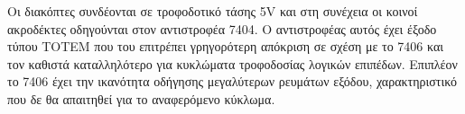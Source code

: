 \documentclass[a4paper,10pt]{article} \usepackage{anysize}
\begin{document}
Οι διακόπτες συνδέονται σε τροφοδοτικό τάσης 5V και στη συνέχεια οι κοινοί
ακροδέκτες οδηγούνται στον αντιστροφέα 7404. Ο αντιστροφέας αυτός έχει έξοδο
τύπου ΤΟΤΕΜ που του επιτρέπει γρηγορότερη απόκριση σε σχέση με το 7406 και τον
καθιστά καταλληλότερο για κυκλώματα τροφοδοσίας λογικών επιπέδων. Επιπλέον το
7406 έχει την ικανότητα οδήγησης μεγαλύτερων ρευμάτων εξόδου, χαρακτηριστικό
που δε θα απαιτηθεί για το αναφερόμενο κύκλωμα.
\end{document}
